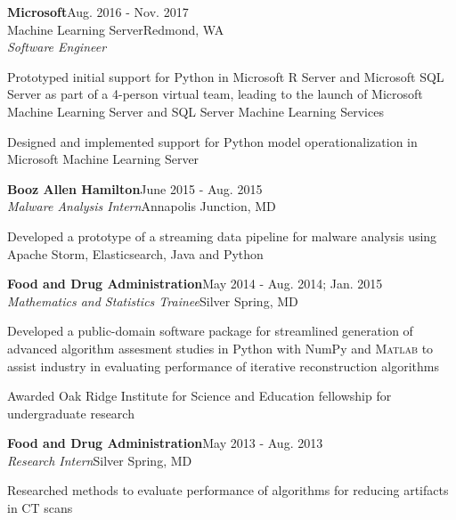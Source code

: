 \documentclass[letterpaper,11pt]{article}
\def \jobskip{1em}
\newcommand{\resentry}[6]{
\large{\sffamily\textbf{#1}}\hfill{\rmfamily\normalsize\textcolor{faded}{#2}} \\
\normalsize{#3}\hfill{\textcolor{faded}{\normalsize#4}}\\
\normalsize{#5}
\footnotesize{#6}
}
\begin{document}
\vspace{\jobskip}
\resentry{{Microsoft}}{Aug. 2016 \-- Nov. 2017}{Machine Learning Server}{Redmond, WA}{\emph{Software Engineer}}
{ 
      \begin{resumeitemize}
	\item {Prototyped initial support for Python in Microsoft R Server and Microsoft SQL Server as part of a 4-person virtual team, leading to the launch of Microsoft Machine Learning Server and SQL Server Machine Learning Services}
	 \item{Designed and implemented support for Python model operationalization in Microsoft Machine Learning Server}	
          \end{resumeitemize}
}
\vspace{\jobskip}
\resentry{{Booz Allen Hamilton}}{June 2015 \-- Aug. 2015}{\emph{Malware Analysis Intern}}{Annapolis Junction, MD}{\vspace{-1em}}
{ 
      \begin{resumeitemize}
	\item{Developed a prototype of a streaming data pipeline for malware analysis using Apache Storm, Elasticsearch, Java and Python}
          \end{resumeitemize}
}
\vspace{\jobskip}
\resentry{{Food and Drug Administration}}{May 2014 \-- Aug. 2014; Jan. 2015}{\emph{Mathematics and Statistics Trainee}}{Silver Spring, MD}{\vspace{-1em}}
   { 
      \begin{resumeitemize}
            \item{Developed a public-domain software package for streamlined generation of advanced algorithm assesment studies in Python with NumPy and \textsc{Matlab} to assist industry in evaluating performance of iterative reconstruction algorithms}
	 \item{Awarded Oak Ridge Institute for Science and Education fellowship for undergraduate research}
          \end{resumeitemize}
   }
\vspace{\jobskip}
\resentry{{Food and Drug Administration}}{May 2013 \-- Aug. 2013}{\emph{Research Intern}}{Silver Spring, MD}{\vspace{-1em}}
   { 
\begin{resumeitemize}
\item{Researched methods to evaluate performance of algorithms for reducing artifacts in CT scans}
\end{resumeitemize}
   }
\end{document}

